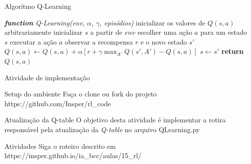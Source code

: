 \documentclass{beamer}
\begin{document}
\begin{frame}{Algoritmo Q-Learning} 
	\begin{algorithmic} 
		\STATE \emph{\textbf{function} Q-Learning(env, $\alpha$, $\gamma$, episódios)}
		\STATE inicializar os valores de $Q(s, a)$ arbitrariamente
		\STATE inicializar $s$ a partir de $env$
		\REPEAT
		\STATE escolher uma ação $a$ para um estado $s$
		\STATE executar a ação $a$
		\STATE observar a recompensa $r$ e o novo estado $s'$ 
		\STATE $Q(s,a) \leftarrow Q(s,a) + \alpha [r +\gamma \max_{A'}{Q(s', A')} - Q(s,a)]$
		\STATE$s  \leftarrow s'$
		\ENDFOR
		\STATE \textbf{return} $Q(s, a)$
	\end{algorithmic}
\end{frame}


\begin{frame}{Atividade de implementação}
	
	\begin{block}{Setup do ambiente}
		Faça o clone ou fork do projeto https://github.com/Insper/rl\_code
		\href{https://github.com/Insper/rl_code}{\beamergotobutton{Link}}
	\end{block}
	
	\begin{alertblock}{Atualização da Q-table}
		O objetivo desta atividade é implementar a rotira responsável pela atualização da \textit{Q-table} no arquivo QLearning.py
	\end{alertblock}
	
	\begin{block}{Atividades}
		Siga o roteiro descrito em https://insper.github.io/ia\_bcc/aulas/15\_rl/ \href{https://insper.github.io/ia_bcc/aulas/15_rl/}
		{\beamergotobutton{Link}}
	\end{block}

\end{frame}

%
%
\end{document}
